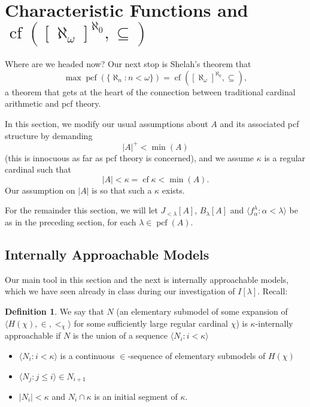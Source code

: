 \documentclass[10pt]{amsart}
\theoremstyle{plain}
\theoremstyle{definition}
\newtheorem{definition}[proposition]{Definition}
\theoremstyle{remark}
\DeclareMathOperator{\cf}{cf}
\DeclareMathOperator{\pcf}{pcf}
\numberwithin{equation}{section}
\begin{document}
\section{Characteristic Functions and $\cf\left([\aleph_\omega]^{\aleph_0},\subseteq\right)$}


Where are we headed now? Our next stop is Shelah's theorem that
\begin{equation}
\max\pcf\left(\{\aleph_n:n<\omega\}\right) = \cf\left([\aleph_\omega]^{\aleph_0},\subseteq\right),
\end{equation}
a theorem that gets at the heart of the connection between traditional cardinal arithmetic and pcf theory.

In this section, we modify our usual assumptions about $A$ and its associated pcf structure by demanding
\begin{equation}
|A|^+<\min(A)
\end{equation}
(this is innocuous as far as pcf theory is concerned), and we assume $\kappa$ is a regular cardinal such that
\begin{equation}
|A|<\kappa=\cf\kappa<\min(A).
\end{equation}
Our assumption on $|A|$ is so that such a $\kappa$ exists.

For the remainder this section, we will let $J_{<\lambda}[A]$, $B_\lambda[A]$ and $\langle f^\lambda_\alpha:\alpha<\lambda\rangle$ be as in the preceding section, for each $\lambda\in\pcf(A)$.


\subsection{Internally Approachable Models}

Our main tool in this section and the next is internally approachable models, which we have seen already in class during our investigation of $I[\lambda]$. Recall:

\begin{definition}
We say that $N$ (an elementary submodel of some expansion of $\langle H(\chi),\in, <_\chi\rangle$ for some sufficiently large
    regular cardinal $\chi$) is $\kappa$-internally approachable if $N$ is the union of a sequence $\langle N_i:i<\kappa\rangle$
\begin{itemize}
\item $\langle N_i:i<\kappa\rangle$ is a continuous $\in$-sequence of elementary submodels of $H(\chi)$



\item $\langle N_j:j\leq i\rangle\in N_{i+1}$


\item $|N_i|<\kappa$ and $N_i\cap\kappa$ is an initial segment of $\kappa$.
\end{itemize}
\end{definition}
\end{document}
